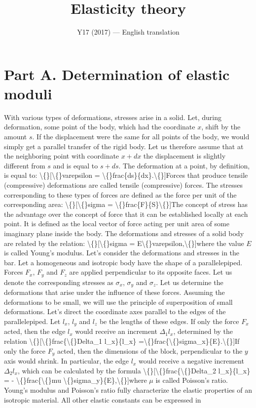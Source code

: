 \documentclass[11pt,a4paper]{article}
\title{\textbf{Elasticity theory}}
\author{\normalsize Y17 (2017) --- English translation}
\date{}
\begin{document}
\maketitle

\section*{Part A. Determination of elastic moduli}

With various types of deformations, stresses arise in a solid. Let, during deformation, some point of the body, which had the coordinate $x$, shift by the amount $s$. If the displacement were the same for all points of the body, we would simply get a parallel transfer of the rigid body. Let us therefore assume that at the neighboring point with coordinate $x+ dx$ the displacement is slightly different from $s$ and is equal to $s+ds$. The deformation at a point, by definition, is equal to: \textbackslash\{\}[\textbackslash\{\}varepsilon = \textbackslash\{\}frac\{ds\}\{dx\}.\textbackslash\{\}]Forces that produce tensile (compressive) deformations are called tensile (compressive) forces. The stresses corresponding to these types of forces are defined as the force per unit of the corresponding area: \textbackslash\{\}[\textbackslash\{\}sigma = \textbackslash\{\}frac\{F\}\{S\}\textbackslash\{\}]The concept of stress has the advantage over the concept of force that it can be established locally at each point. It is defined as the local vector of force acting per unit area of ​​some imaginary plane inside the body. The deformations and stresses of a solid body are related by the relation: \textbackslash\{\}[\textbackslash\{\}sigma = E\textbackslash\{\}varepsilon,\textbackslash\{\}]where the value $E$ is called Young’s modulus. Let's consider the deformations and stresses in the bar. Let a homogeneous and isotropic body have the shape of a parallelepiped. Forces $F_x$, $F_y$ and $F_z$ are applied perpendicular to its opposite faces. Let us denote the corresponding stresses as $\sigma_x$, $\sigma_y$ and $\sigma_z$. Let us determine the deformations that arise under the influence of these forces. Assuming the deformations to be small, we will use the principle of superposition of small deformations. Let's direct the coordinate axes parallel to the edges of the parallelepiped. Let $l_x$, $l_y$ and $l_z$ be the lengths of these edges. If only the force $F_x$ acted, then the edge $l_x$ would receive an increment $\Delta_1 l_x$, determined by the relation \textbackslash\{\}[\textbackslash\{\}frac\{\textbackslash\{\}Delta_1 l_x\}\{l_x\} =\textbackslash\{\}frac\{\textbackslash\{\}sigma_x\}\{E\}.\textbackslash\{\}]If only the force $F_y$ acted, then the dimensions of the block, perpendicular to the $y$ axis would shrink. In particular, the edge $l_x$ would receive a negative increment $\Delta_2 l_x$, which can be calculated by the formula \textbackslash\{\}[\textbackslash\{\}frac\{\textbackslash\{\}Delta_2 l_x\}\{l_x\} = - \textbackslash\{\}frac\{\textbackslash\{\}mu \textbackslash\{\}sigma_y\}\{E\},\textbackslash\{\}]where $\mu$ is called Poisson's ratio. Young's modulus and Poisson's ratio fully characterize the elastic properties of an isotropic material. All other elastic constants can be expressed in 
\end{document}
